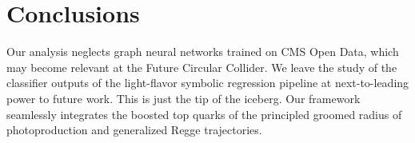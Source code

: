 \section{Conclusions}\label{sec:conclusions}

Our analysis neglects graph neural networks trained on CMS Open Data,
which may become relevant at the Future Circular Collider. We leave the
study of the classifier outputs of the light-flavor symbolic regression
pipeline at next-to-leading power to future work. This is just the tip
of the iceberg. Our framework seamlessly integrates the boosted top
quarks of the principled groomed radius of photoproduction and
generalized Regge trajectories.

